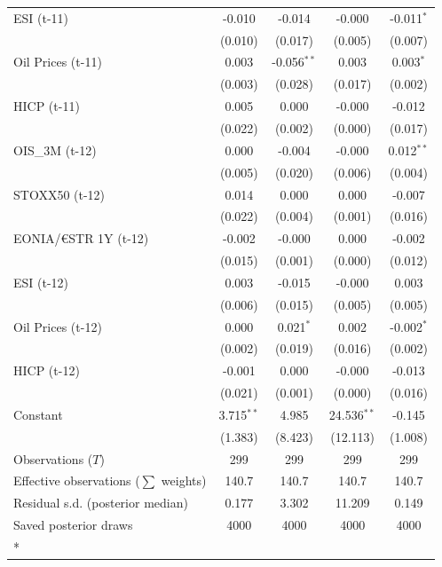 \begin{longtable}[t]{lcccc}
ESI (t-11) & -0.010 & -0.014 & -0.000 & -0.011$^{*}$\\
 & (0.010) & (0.017) & (0.005) & (0.007)\\
Oil Prices (t-11) & 0.003 & -0.056$^{**}$ & 0.003 & 0.003$^{*}$\\
 & (0.003) & (0.028) & (0.017) & (0.002)\\
HICP (t-11) & 0.005 & 0.000 & -0.000 & -0.012\\
 & (0.022) & (0.002) & (0.000) & (0.017)\\
OIS\_3M (t-12) & 0.000 & -0.004 & -0.000 & 0.012$^{**}$\\
 & (0.005) & (0.020) & (0.006) & (0.004)\\
STOXX50 (t-12) & 0.014 & 0.000 & 0.000 & -0.007\\
 & (0.022) & (0.004) & (0.001) & (0.016)\\
EONIA/€STR 1Y (t-12) & -0.002 & -0.000 & 0.000 & -0.002\\
 & (0.015) & (0.001) & (0.000) & (0.012)\\
ESI (t-12) & 0.003 & -0.015 & -0.000 & 0.003\\
 & (0.006) & (0.015) & (0.005) & (0.005)\\
Oil Prices (t-12) & 0.000 & 0.021$^{*}$ & 0.002 & -0.002$^{*}$\\
 & (0.002) & (0.019) & (0.016) & (0.002)\\
HICP (t-12) & -0.001 & 0.000 & -0.000 & -0.013\\
 & (0.021) & (0.001) & (0.000) & (0.016)\\
Constant & 3.715$^{**}$ & 4.985 & 24.536$^{**}$ & -0.145\\
 & (1.383) & (8.423) & (12.113) & (1.008)\\
\midrule
Observations ($T$) & 299 & 299 & 299 & 299\\
Effective observations ($\sum$ weights) & 140.7 & 140.7 & 140.7 & 140.7\\
Residual s.d. (posterior median) & 0.177 & 3.302 & 11.209 & 0.149\\
Saved posterior draws & 4000 & 4000 & 4000 & 4000\\*
\end{longtable}
\endgroup{}

\begingroup\fontsize{7}{9}\selectfont

